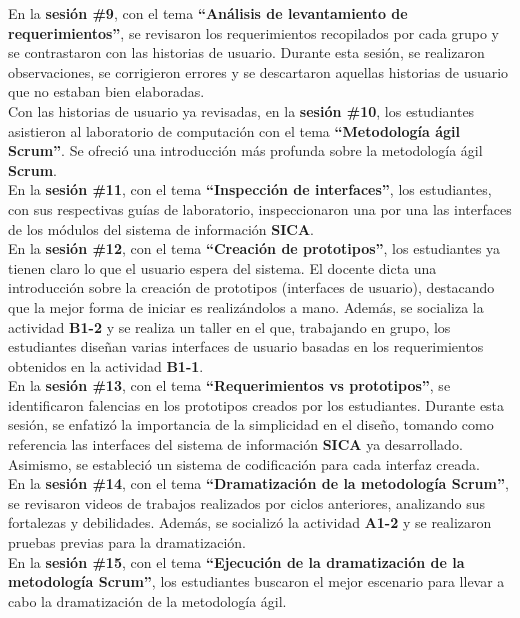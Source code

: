 \documentclass[12pt]{article}
\begin{document}
\begin{multicols}{2}
En la \textbf{sesión \#9}, con el tema \textbf{``Análisis de levantamiento de requerimientos''}, se revisaron los requerimientos recopilados por cada grupo y se contrastaron con las historias de usuario. Durante esta sesión, se realizaron observaciones, se corrigieron errores y se descartaron aquellas historias de usuario que no estaban bien elaboradas.\\
Con las historias de usuario ya revisadas, en la \textbf{sesión \#10}, los estudiantes asistieron al laboratorio de computación con el tema \textbf{``Metodología ágil Scrum''}. Se ofreció una introducción más profunda sobre la metodología ágil \textbf{Scrum}.\\
En la \textbf{sesión \#11}, con el tema \textbf{``Inspección de interfaces''}, los estudiantes, con sus respectivas guías de laboratorio, inspeccionaron una por una las interfaces de los módulos del sistema de información \textbf{SICA}.\\
En la \textbf{sesión \#12}, con el tema \textbf{``Creación de prototipos''}, los estudiantes ya tienen claro lo que el usuario espera del sistema. El docente dicta una introducción sobre la creación de prototipos (interfaces de usuario), destacando que la mejor forma de iniciar es realizándolos a mano. Además, se socializa la actividad \textbf{B1-2} y se realiza un taller en el que, trabajando en grupo, los estudiantes diseñan varias interfaces de usuario basadas en los requerimientos obtenidos en la actividad \textbf{B1-1}.\\
En la \textbf{sesión \#13}, con el tema \textbf{``Requerimientos vs prototipos''}, se identificaron falencias en los prototipos creados por los estudiantes. Durante esta sesión, se enfatizó la importancia de la simplicidad en el diseño, tomando como referencia las interfaces del sistema de información \textbf{SICA} ya desarrollado. Asimismo, se estableció un sistema de codificación para cada interfaz creada.\\
En la \textbf{sesión \#14}, con el tema \textbf{``Dramatización de la metodología Scrum''}, se revisaron videos de trabajos realizados por ciclos anteriores, analizando sus fortalezas y debilidades. Además, se socializó la actividad \textbf{A1-2} y se realizaron pruebas previas para la dramatización.\\
En la \textbf{sesión \#15}, con el tema \textbf{``Ejecución de la dramatización de la metodología Scrum''}, los estudiantes buscaron el mejor escenario para llevar a cabo la dramatización de la metodología ágil.\\

\end{multicols}
\end{document}
